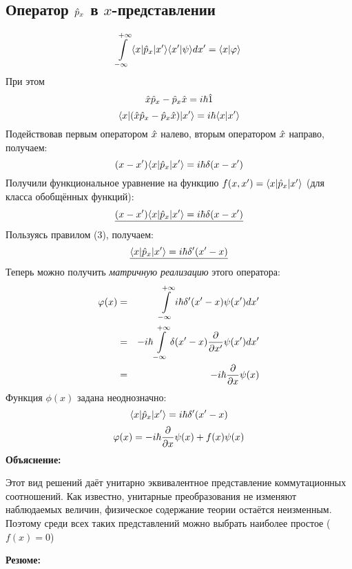 \subsection{Оператор $\Hat p_x$ в $x$-представлении}
$$
    \int\limits_{-\infty}^{+\infty} { \langle x |\Hat p_x| x' \rangle } \langle x' | \psi \rangle dx' = \langle x | \varphi \rangle
$$
При этом
$$
    { \Hat x \Hat p_x - \Hat p_x \Hat x } = i \hbar \Hat 1
$$
$$
    { \langle x |({ \Hat x \Hat p_x - \Hat p_x \Hat x })| x' \rangle } = i\hbar \langle x | x' \rangle
$$
Подействовав первым оператором $\Hat x$ налево, вторым оператором $\Hat x$ направо, получаем:
$$
    (x - x') { \langle x |\Hat p_x| x' \rangle } = i\hbar \delta(x - x')
$$
Получили функциональное уравнение на функцию $f(x, x') = { \langle x |\Hat p_x| x' \rangle }$ (для класса обобщённых функций):
$$
    \underline{(x - x') { \langle x |\Hat p_x| x' \rangle } = i\hbar \delta(x - x')}
$$
Пользуясь правилом (3), получаем:
$$
    \underline{{ \langle x |\Hat p_x| x' \rangle } = i\hbar {\delta}'(x' - x)}
$$
Теперь можно получить \emph{матричную реализацию} этого оператора:
\begin{eqnarray*}
    \varphi(x) &=& \int\limits_{-\infty}^{+\infty} i \hbar \delta'(x' - x) \psi(x') dx'\\
    &=& -i\hbar \int\limits_{-\infty}^{+\infty} \delta(x' - x) \dfrac{\partial }{\partial x'} \psi(x') dx'\\
    &=& -i \hbar \dfrac{\partial }{\partial x} \psi(x)
\end{eqnarray*}
\Rem Функция $\phi(x)$ задана неоднозначно:
$$
    { \langle x |\Hat p_x| x' \rangle } = i \hbar \delta'(x' - x)
$$
$$
    \varphi(x) = -i \hbar \dfrac{\partial }{\partial x} \psi(x) + f(x) \psi(x)
$$
\textbf{Объяснение:}

Этот вид решений даёт унитарно эквивалентное представление коммутационных соотношений. Как известно, унитарные преобразования не изменяют наблюдаемых величин, физическое содержание теории остаётся неизменным. Поэтому среди всех таких представлений можно выбрать наиболее простое ($f(x) = 0$)

\textbf{Резюме:}

